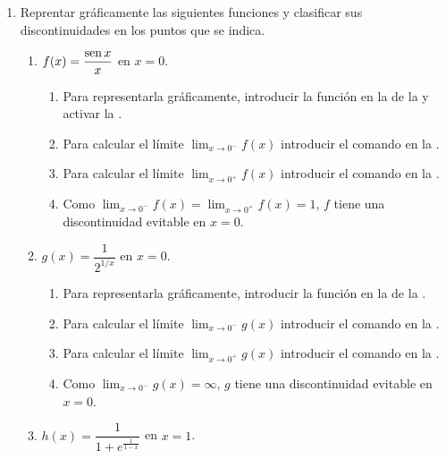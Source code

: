 \begin{enumerate}[leftmargin=*]
\item Reprentar gráficamente las siguientes funciones y clasificar sus discontinuidades en los puntos que se indica.
      \begin{enumerate}
      \item  $f(x)=\dfrac{\operatorname{sen} x}{x}$ en $x=0$.

            \begin{indication}
            \begin{enumerate}
            \item Para representarla gráficamente, introducir la función  en la  de la  y activar la .
            \item Para calcular el límite $\lim_{x\rightarrow 0^-}f(x)$ introducir el comando  en la .
            \item Para calcular el límite $\lim_{x\rightarrow 0^+}f(x)$ introducir el comando  en la .
            \item Como $\lim_{x\rightarrow 0^-}f(x)=\lim_{x\rightarrow 0^+}f(x)=1$, $f$ tiene una discontinuidad evitable en $x=0$.
            \end{enumerate}
            \end{indication}
      \item $g(x)=\dfrac{1}{2^{1/x}}$ en $x=0$.
            \begin{indication}
            \begin{enumerate}
            \item Para representarla gráficamente, introducir la función  en la  de la .
            \item Para calcular el límite $\lim_{x\rightarrow 0^-}g(x)$ introducir el comando  en la .
            \item Para calcular el límite $\lim_{x\rightarrow 0^+}g(x)$ introducir el comando  en la .
            \item Como $\lim_{x\rightarrow 0^-}g(x)=\infty$, $g$ tiene una discontinuidad evitable en $x=0$.
            \end{enumerate}
            \end{indication}
      \item $h(x)=\dfrac{1}{1+e^{\frac{1}{1-x}}}$ en $x=1$.

\end{enumerate}
\end{enumerate}
